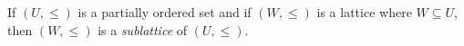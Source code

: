 If $(U, \leq)$ is a partially ordered set and if $(W, \leq)$ is a lattice where $W \subseteq U$, then $(W, \leq)$ is a \textit{sublattice} of $(U, \leq)$.
